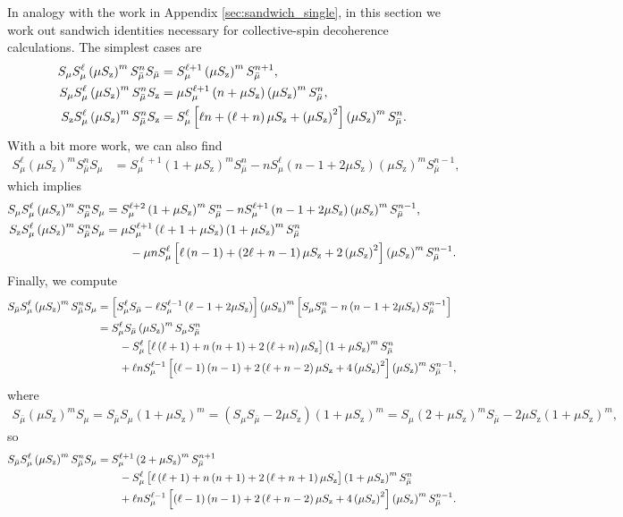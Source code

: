\documentclass[pra,twocolumn,longbibliography]{revtex4-2}
\newcommand{\p}[1]{\left( #1 \right)} %
\renewcommand{\sp}[1]{\left[ #1 \right]} %
\newcommand{\z}{\text{z}}
\newcommand{\bmu}{{\bar\mu}}
\newcommand{\1}{\mathds{1}}
\begin{document}
In analogy with the work in Appendix \ref{sec:sandwich_single}, in
this section we work out sandwich identities necessary for
collective-spin decoherence calculations.  The simplest cases are
\begin{align}
  S_\mu S_\mu^\ell \p{\mu S_\z}^m S_\bmu^n S_\bmu
  &= S_\mu^{\ell+1} \p{\mu S_\z}^m S_\bmu^{n+1},
  \allowdisplaybreaks \\
  S_\mu S_\mu^\ell \p{\mu S_\z}^m S_\bmu^n S_\z
  &= \mu S_\mu^{\ell+1} \p{n+\mu S_\z} \p{\mu S_\z}^m S_\bmu^n,
  \allowdisplaybreaks \\
  S_\z S_\mu^\ell \p{\mu S_\z}^m S_\bmu^n S_\z
  &= S_\mu^\ell \sp{\ell n + \p{\ell+n} \mu S_\z + \p{\mu S_\z}^2}
  \p{\mu S_\z}^m S_\bmu^n.
\end{align}
With a bit more work, we can also find
\begin{align}
  S_\mu^\ell \p{\mu S_\z}^m S_\bmu^n S_\mu
  &= S_\mu^{\ell+1} \p{1+\mu S_\z}^m S_\bmu^n
  - n S_\mu^\ell \p{n-1+2\mu S_\z} \p{\mu S_\z}^m S_\bmu^{n-1},
\end{align}
which implies
\begin{align}
  S_\mu S_\mu^\ell \p{\mu S_\z}^m S_\bmu^n S_\mu
  &= S_\mu^{\ell+2} \p{1+\mu S_\z}^m S_\bmu^n
  - n S_\mu^{\ell+1} \p{n-1+2\mu S_\z} \p{\mu S_\z}^m S_\bmu^{n-1},
  \allowdisplaybreaks \\
  S_\z S_\mu^\ell \p{\mu S_\z}^m S_\bmu^n S_\mu
  &= \mu S_\mu^{\ell+1} \p{\ell+1+\mu S_\z} \p{1+\mu S_\z}^m S_\bmu^n
  \notag \\
  &\qquad - \mu n S_\mu^\ell
  \sp{\ell\p{n-1} + \p{2\ell+n-1}\mu S_\z + 2\p{\mu S_\z}^2}
  \p{\mu S_\z}^m S_\bmu^{n-1}.
\end{align}
Finally, we compute
\begin{align}
  S_\bmu S_\mu^\ell \p{\mu S_\z}^m S_\bmu^n S_\mu
  &= \sp{S_\mu^\ell S_\bmu - \ell S_\mu^{\ell-1} \p{\ell-1+2\mu S_\z}}
  \p{\mu S_\z}^m
  \sp{S_\mu S_\bmu^n - n \p{n-1+2\mu S_\z} S_\bmu^{n-1}} \notag \\
  &= S_\mu^\ell S_\bmu \p{\mu S_\z}^m S_\mu S_\bmu^n \notag \\
  &\qquad - S_\mu^\ell
  \sp{\ell\p{\ell+1} + n\p{n+1}+2\p{\ell+n}\mu S_\z}
  \p{1+\mu S_\z}^m S_\bmu^n \notag \\
  &\qquad + \ell n S_\mu^{\ell-1}
  \sp{\p{\ell-1}\p{n-1}+2\p{\ell+n-2}\mu S_\z + 4\p{\mu S_\z}^2}
  \p{\mu S_\z}^m S_\bmu^{n-1},
\end{align}
where
\begin{multline}
  S_\bmu \p{\mu S_\z}^m S_\mu
  = S_\bmu S_\mu \p{1+\mu S_\z}^m
  = \p{S_\mu S_\bmu - 2\mu S_\z} \p{1+\mu S_\z}^m
  = S_\mu \p{2+\mu S_\z}^m S_\bmu - 2\mu S_\z \p{1+\mu S_\z}^m,
\end{multline}
so
\begin{align}
  S_\bmu S_\mu^\ell \p{\mu S_\z}^m S_\bmu^n S_\mu
  &= S_\mu^{\ell+1} \p{2+\mu S_\z}^m S_\bmu^{n+1} \notag \\
  &\qquad - S_\mu^\ell
  \sp{\ell\p{\ell+1} + n\p{n+1}+2\p{\ell+n+1}\mu S_\z}
  \p{1+\mu S_\z}^m S_\bmu^n \notag \\
  &\qquad + \ell n S_\mu^{\ell-1}
  \sp{\p{\ell-1}\p{n-1}+2\p{\ell+n-2}\mu S_\z + 4\p{\mu S_\z}^2}
  \p{\mu S_\z}^m S_\bmu^{n-1}.
\end{align}
\end{document}
